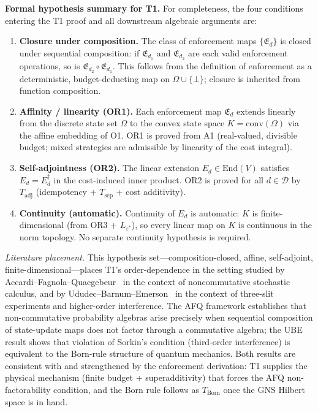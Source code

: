 \documentclass[11pt]{article}
\theoremstyle{remark}
\begin{document}
\begin{tcolorbox}[apfbox, title={Theorem T1 --- The Bridge Theorem (Order-Dependence)}]
\smallskip\noindent\textbf{Formal hypothesis summary for T1.}  For completeness, the four conditions entering the T1 proof and all downstream algebraic arguments are:
\begin{enumerate}[nosep,leftmargin=2em,itemsep=2pt]
  \item \textbf{Closure under composition.}  The class of enforcement maps $\{\mathfrak{E}_d\}$ is closed under sequential composition: if $\mathfrak{E}_{d_1}$ and $\mathfrak{E}_{d_2}$ are each valid enforcement operations, so is $\mathfrak{E}_{d_2} \circ \mathfrak{E}_{d_1}$.  This follows from the definition of enforcement as a deterministic, budget-deducting map on $\Omega \cup \{\bot\}$; closure is inherited from function composition.
  \item \textbf{Affinity / linearity (OR1).}  Each enforcement map $\mathfrak{E}_d$ extends linearly from the discrete state set $\Omega$ to the convex state space $K = \mathrm{conv}(\Omega)$ via the affine embedding of O1.  OR1 is proved from A1 (real-valued, divisible budget; mixed strategies are admissible by linearity of the cost integral).
  \item \textbf{Self-adjointness (OR2).}  The linear extension $E_d \in \mathrm{End}(V)$ satisfies $E_d = E_d^\dagger$ in the cost-induced inner product.  OR2 is proved for all $d \in \mathcal{D}$ by $T_{\mathrm{adj}}$ (idempotency + $T_{\mathrm{sep}}$ + cost additivity).
  \item \textbf{Continuity (automatic).}  Continuity of $E_d$ is automatic: $K$ is finite-dimensional (from OR3 + $L_{\varepsilon^*}$), so every linear map on $K$ is continuous in the norm topology.  No separate continuity hypothesis is required.
\end{enumerate}

\smallskip\noindent\textit{Literature placement.}  This hypothesis set---composition-closed, affine, self-adjoint, finite-dimensional---places T1's order-dependence in the setting studied by Accardi--Fagnola--Quaegebeur~\cite{AFQ1992} in the context of noncommutative stochastic calculus, and by Ududec--Barnum--Emerson~\cite{UBE2011} in the context of three-slit experiments and higher-order interference.  The AFQ framework establishes that non-commutative probability algebras arise precisely when sequential composition of state-update maps does not factor through a commutative algebra; the UBE result shows that violation of Sorkin's condition (third-order interference) is equivalent to the Born-rule structure of quantum mechanics.  Both results are consistent with and strengthened by the enforcement derivation: T1 supplies the physical mechanism (finite budget + superadditivity) that forces the AFQ non-factorability condition, and the Born rule follows as $T_{\mathrm{Born}}$ once the GNS Hilbert space is in hand.


\end{tcolorbox}
\end{document}
